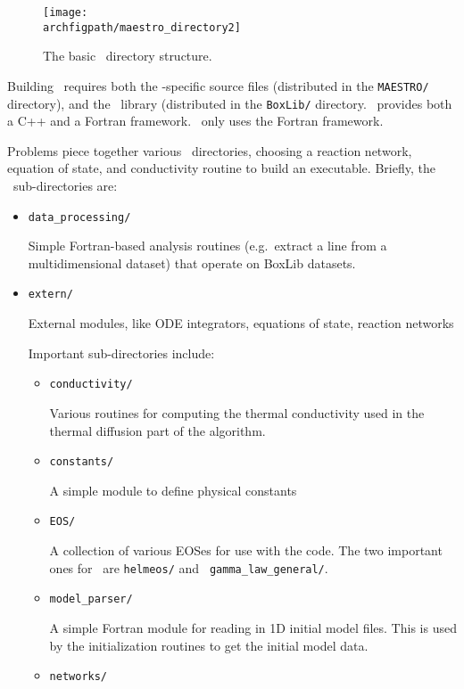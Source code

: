 \begin{figure}[t]
\centering
\texttt{[image: \\archfigpath/maestro\_directory2]}
\caption[\maestro\ directory structure]
{The basic \maestro\ directory structure.}
\end{figure}


Building \maestro\ requires both the \maestro-specific source
files (distributed in the {\tt MAESTRO/} directory), and the
\boxlib\ library (distributed in the {\tt BoxLib/} directory.
\boxlib\ provides both a C++ and a Fortran framework.  \maestro\
only uses the Fortran framework.

Problems piece together various \maestro\ directories, choosing a
reaction network, equation of state, and conductivity routine to build
an executable.  Briefly, the \maestro\ sub-directories are:
\begin{itemize}
\item {\tt data\_processing/}

  Simple Fortran-based analysis routines (e.g.\ extract a line from a
  multidimensional dataset) that operate on BoxLib datasets.

\item {\tt extern/}

  External modules, like ODE integrators, equations of state, reaction
  networks

  Important sub-directories include:
 
  \begin{itemize}
  \item {\tt conductivity/}

    Various routines for computing the thermal conductivity used in the
    thermal diffusion part of the algorithm.

  \item {\tt constants/}

    A simple module to define physical constants

  \item {\tt EOS/}

    A collection of various EOSes for use with the code.  The two
    important ones for \maestro\ are {\tt helmeos/} and {\tt
    gamma\_law\_general/}.

  \item {\tt model\_parser/}

    A simple Fortran module for reading in 1D initial model files.
    This is used by the initialization routines to get the initial
    model data.

  \item {\tt networks/}


\end{itemize}
\end{itemize}
